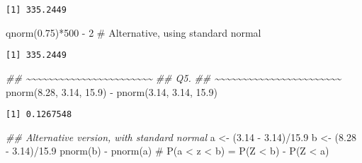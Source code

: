 \documentclass[
  letterpaper,
  DIV=11,
  numbers=noendperiod]{scrreprt}
\newenvironment{Shaded}{\begin{snugshade}}{\end{snugshade}}
\newcommand{\CommentTok}[1]{\textcolor[rgb]{0.37,0.37,0.37}{#1}}
\newcommand{\DecValTok}[1]{\textcolor[rgb]{0.68,0.00,0.00}{#1}}
\newcommand{\DocumentationTok}[1]{\textcolor[rgb]{0.37,0.37,0.37}{\textit{#1}}}
\newcommand{\FloatTok}[1]{\textcolor[rgb]{0.68,0.00,0.00}{#1}}
\newcommand{\FunctionTok}[1]{\textcolor[rgb]{0.28,0.35,0.67}{#1}}
\newcommand{\NormalTok}[1]{\textcolor[rgb]{0.00,0.23,0.31}{#1}}
\newcommand{\OtherTok}[1]{\textcolor[rgb]{0.00,0.23,0.31}{#1}}
\newcommand{\SpecialCharTok}[1]{\textcolor[rgb]{0.37,0.37,0.37}{#1}}
\begin{document}
\begin{verbatim}
[1] 335.2449
\end{verbatim}

\begin{Shaded}
\begin{Highlighting}[]
\FunctionTok{qnorm}\NormalTok{(}\FloatTok{0.75}\NormalTok{)}\SpecialCharTok{*}\DecValTok{500} \SpecialCharTok{{-}} \DecValTok{2} \CommentTok{\# Alternative, using standard normal}
\end{Highlighting}
\end{Shaded}

\begin{verbatim}
[1] 335.2449
\end{verbatim}

\begin{Shaded}
\begin{Highlighting}[]
\DocumentationTok{\#\# \textasciitilde{}\textasciitilde{}\textasciitilde{}\textasciitilde{}\textasciitilde{}\textasciitilde{}\textasciitilde{}\textasciitilde{}\textasciitilde{}\textasciitilde{}\textasciitilde{}\textasciitilde{}\textasciitilde{}\textasciitilde{}\textasciitilde{}\textasciitilde{}\textasciitilde{}\textasciitilde{}\textasciitilde{}\textasciitilde{}\textasciitilde{}\textasciitilde{}\textasciitilde{}}
\DocumentationTok{\#\# Q5.}
\DocumentationTok{\#\# \textasciitilde{}\textasciitilde{}\textasciitilde{}\textasciitilde{}\textasciitilde{}\textasciitilde{}\textasciitilde{}\textasciitilde{}\textasciitilde{}\textasciitilde{}\textasciitilde{}\textasciitilde{}\textasciitilde{}\textasciitilde{}\textasciitilde{}\textasciitilde{}\textasciitilde{}\textasciitilde{}\textasciitilde{}\textasciitilde{}\textasciitilde{}\textasciitilde{}\textasciitilde{}}
\FunctionTok{pnorm}\NormalTok{(}\FloatTok{8.28}\NormalTok{, }\FloatTok{3.14}\NormalTok{, }\FloatTok{15.9}\NormalTok{) }\SpecialCharTok{{-}} \FunctionTok{pnorm}\NormalTok{(}\FloatTok{3.14}\NormalTok{, }\FloatTok{3.14}\NormalTok{, }\FloatTok{15.9}\NormalTok{)}
\end{Highlighting}
\end{Shaded}

\begin{verbatim}
[1] 0.1267548
\end{verbatim}

\begin{Shaded}
\begin{Highlighting}[]
\DocumentationTok{\#\# Alternative version, with standard normal}
\NormalTok{a }\OtherTok{\textless{}{-}}\NormalTok{ (}\FloatTok{3.14} \SpecialCharTok{{-}} \FloatTok{3.14}\NormalTok{)}\SpecialCharTok{/}\FloatTok{15.9}
\NormalTok{b }\OtherTok{\textless{}{-}}\NormalTok{ (}\FloatTok{8.28} \SpecialCharTok{{-}} \FloatTok{3.14}\NormalTok{)}\SpecialCharTok{/}\FloatTok{15.9}
\FunctionTok{pnorm}\NormalTok{(b) }\SpecialCharTok{{-}} \FunctionTok{pnorm}\NormalTok{(a) }\CommentTok{\# P(a \textless{} z \textless{} b) = P(Z \textless{} b) {-} P(Z \textless{} a)}
\end{Highlighting}
\end{Shaded}
\end{document}
